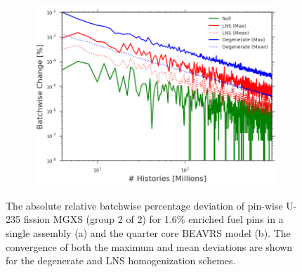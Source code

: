 \clearpage

\begin{figure}[h!]
\centering
\begin{subfigure}{.87\textwidth}
  \centering
  \includegraphics[width=\linewidth]{figures/patterns/convergence/assm-16/assm-16-dev-fission-2}
  \caption{}
  \label{fig:chap9-assm-16-dev-fiss-2}
\end{subfigure}
\caption[Convergence of U-235 fission MGXS batchwise deviation]{The absolute relative batchwise percentage deviation of pin-wise U-235 fission \ac{MGXS} (group 2 of 2) for 1.6\% enriched fuel pins in a single assembly (a) and the quarter core \ac{BEAVRS} model (b). The convergence of both the maximum and mean  deviations are shown for the degenerate and \ac{LNS} homogenization schemes.}
\label{fig:chap9-fiss-2-dev}
\end{figure}

\clearpage

